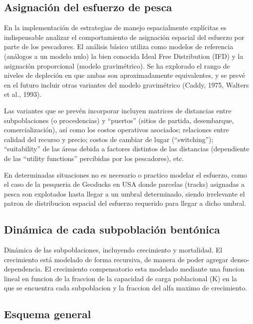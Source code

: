 \documentclass[12pt, oneside, a4paper]{article}
\begin{document}
		\subsection{Asignación del esfuerzo de pesca}

			En la implementación de estrategias de manejo espacialmente explícitas es indispensable analizar el comportamiento de asignación espacial del esfuerzo por parte de los pescadores. El análisis básico utiliza como modelos de referencia (análogos a un modelo nulo) la bien conocida Ideal Free Distribution (IFD) y la asignación proporcional (modelo gravimétrico). Se ha explorado el rango de niveles de depleción en que ambas son aproximadamente equivalentes, y se prevé en el futuro incluir otras variantes del modelo gravimétrico (Caddy, 1975, Walters et al., 1993).

			Las variantes que se prevén incorporar incluyen matrices de distancias entre subpoblaciones (o procedencias) y “puertos” (sitios de partida, desembarque, comercialización), así como los costos operativos asociados; relaciones entre calidad del recurso y precio; costos de cambiar de lugar (“switching”); “suitability” de las áreas debida a factores distintos de las distancias (dependiente de las “utility functions” percibidas por los pescadores), etc.

			En determinadas situaciones no es necesario o practico modelar el esfuerzo, como el caso de la pesqueria de Geoducks en USA donde parcelas (tracks) asignadas a pesca son explotados hasta llegar a un umbral determinado, siendo irrelevante el patron de distribucion espacial del esfuerzo requerido para llegar a dicho umbral.

		\subsection {Dinámica de cada subpoblación bentónica}

			Dinámica de las subpoblaciones, incluyendo crecimiento y mortalidad. El crecimiento está modelado de forma recursiva, de manera de poder agregar denso-dependencia. El crecimiento compensatorio esta modelado mediante una funcion lineal en funcion de la fraccion de la capacidad de carga poblacional (K) en la que se encuentra cada subpoblacion y la fraccion del alfa maximo de crecimiento.

		\subsection{Esquema general}
		
\end{document}
